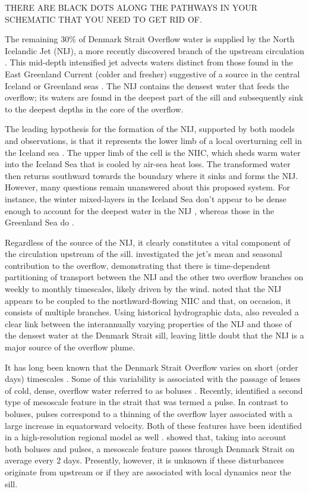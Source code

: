 \documentclass[12pt,titlepage,figuresatend]{article}
\begin{document}
THERE ARE BLACK DOTS ALONG THE PATHWAYS IN YOUR SCHEMATIC THAT YOU NEED TO GET RID OF. 

The remaining 30\% of Denmark Strait Overflow water is supplied by the North Icelandic Jet (NIJ), a more recently discovered branch of the upstream circulation \cite[]{Steingrimur2004,Vage2011}. This mid-depth intensified jet advects waters distinct from those found in the East Greenland Current (colder and fresher) suggestive of a source in the central Iceland or Greenland seas \cite[]{Vage2011,Vage2015,Harden2016}. The NIJ contains the densest water that feeds the overflow; its waters are found in the deepest part of the sill \cite[]{Mastropole2017} and subsequently sink to the deepest depths in the core of the overflow.

The leading hypothesis for the formation of the NIJ, supported by both models and observations, is that it represents the lower limb of a local overturning cell in the Iceland sea \cite[]{Vage2011,Behrens2017}. The upper limb of the cell is the NIIC, which sheds warm water into the Iceland Sea that is cooled by air-sea heat loss. The transformed water then returns southward towards the boundary where it sinks and forms the NIJ. However, many questions remain unanswered about this proposed system. For instance, the winter mixed-layers in the Iceland Sea don't appear to be dense enough to account for the deepest water in the NIJ \cite[]{Vage2015}, whereas those in the Greenland Sea do \cite[]{Strass1993,Rudels2002}.

Regardless of the source of the NIJ, it clearly constitutes a vital component of the circulation upstream of the sill. \cite{Harden2016} investigated the jet's mean and seasonal contribution to the overflow, demonstrating that there is time-dependent partitioning of transport between the NIJ and the other two overflow branches on weekly to monthly timescales, likely driven by the wind. \cite{Pickart2017} noted that the NIJ appears to be coupled to the northward-flowing NIIC and that, on occasion, it consists of multiple branches. Using historical hydrographic data, \cite{Pickart2017} also revealed a clear link between the interannually varying properties of the NIJ and those of the densest water at the Denmark Strait sill, leaving little doubt that the NIJ is a major source of the overflow plume. 

It has long been known that the Denmark Strait Overflow varies on short (order days) timescales \cite[]{Smith1976,Bruce1995,Kase2003}. Some of this variability is associated with the passage of lenses of cold, dense, overflow water referred to as boluses \cite[]{Cooper1955}. Recently, \cite{Appen2017} identified a second type of mesoscale feature in the strait that was termed a pulse. In contrast to boluses, pulses correspond to a thinning of the overflow layer associated with a large increase in equatorward velocity. Both of these features have been identified in a high-resolution regional model as well \cite[]{Almansi2017}. \cite{Appen2017} showed that, taking into account both boluses and pulses, a mesoscale feature passes through Denmark Strait on average every 2 days. Presently, however, it is unknown if these disturbances originate from upstream or if they are associated with local dynamics near the sill. 
\end{document}
